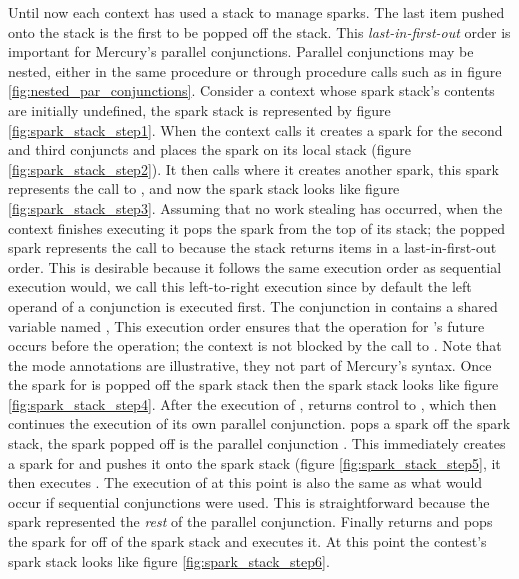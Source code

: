 Until now each context has used a stack to manage sparks.
The last item pushed onto the stack is the first to be popped off the
stack.
This \emph{last-in-first-out} order is important for Mercury's parallel
conjunctions.
Parallel conjunctions may be nested, either in the same procedure or through
procedure calls such as in figure
\ref{fig:nested_par_conjunctions}.
Consider a context whose spark stack's contents are initially undefined,
the spark stack is represented by
figure \ref{fig:spark_stack_step1}.
When the context calls  it creates a spark 
for the second and third conjuncts 
and places the spark on its local stack (figure
\ref{fig:spark_stack_step2}).
It then calls  where it creates another spark,
this spark represents the call to ,
and now the spark stack looks like
figure \ref{fig:spark_stack_step3}.
Assuming that no work stealing has occurred,
when the context finishes executing  it pops the spark from the top
of its stack;
the popped spark represents the call to  because
the stack returns items in a last-in-first-out order.
This is desirable because it follows the same execution order as sequential
execution would,
we call this left-to-right execution since by default the left operand of a
conjunction is executed first.
The conjunction in  contains a shared variable named ,
This execution order ensures that the \signal operation for 's future
occurs before the \wait operation;
the context is not blocked by the call to \wait.
Note that the mode annotations are illustrative,
they not part of Mercury's syntax.
Once the spark for  is popped off the spark stack then the spark
stack looks like figure \ref{fig:spark_stack_step4}.
After the execution of ,  returns control to ,
which then continues the execution of its own parallel conjunction.
 pops a spark off the spark stack,
the spark popped off is the parallel conjunction
.
This immediately creates a spark for  and pushes it onto the spark
stack (figure \ref{fig:spark_stack_step5},
it then executes .
The execution of  at this point is also the same as what would occur
if sequential conjunctions were used.
This is straightforward because
the spark represented the \emph{rest} of the parallel
conjunction.
Finally  returns and  pops the spark for  off of the
spark stack and executes it.
At this point the contest's spark stack looks like figure
\ref{fig:spark_stack_step6}.

